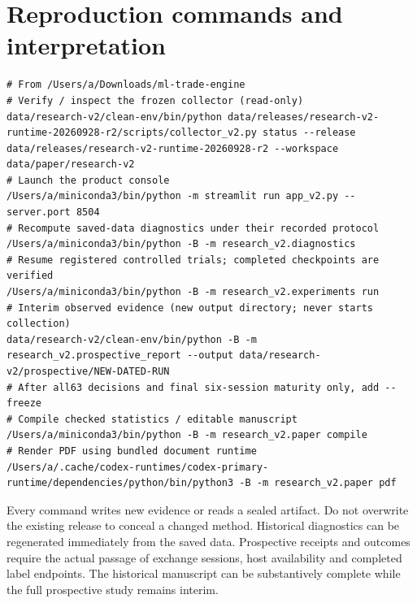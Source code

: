 \clearpage

\section{Reproduction commands and interpretation}\label{sec:appendix-c}

\begin{Verbatim}[breaklines=true,breakanywhere=true,fontsize=\scriptsize]
# From /Users/a/Downloads/ml-trade-engine
# Verify / inspect the frozen collector (read-only)
data/research-v2/clean-env/bin/python data/releases/research-v2-runtime-20260928-r2/scripts/collector_v2.py status --release data/releases/research-v2-runtime-20260928-r2 --workspace data/paper/research-v2
# Launch the product console
/Users/a/miniconda3/bin/python -m streamlit run app_v2.py --server.port 8504
# Recompute saved-data diagnostics under their recorded protocol
/Users/a/miniconda3/bin/python -B -m research_v2.diagnostics
# Resume registered controlled trials; completed checkpoints are verified
/Users/a/miniconda3/bin/python -B -m research_v2.experiments run
# Interim observed evidence (new output directory; never starts collection)
data/research-v2/clean-env/bin/python -B -m research_v2.prospective_report --output data/research-v2/prospective/NEW-DATED-RUN
# After all63 decisions and final six-session maturity only, add --freeze
# Compile checked statistics / editable manuscript
/Users/a/miniconda3/bin/python -B -m research_v2.paper compile
# Render PDF using bundled document runtime
/Users/a/.cache/codex-runtimes/codex-primary-runtime/dependencies/python/bin/python3 -B -m research_v2.paper pdf
\end{Verbatim}

Every command writes new evidence or reads a sealed artifact. Do not overwrite the existing release to conceal a changed method. Historical diagnostics can be regenerated immediately from the saved data. Prospective receipts and outcomes require the actual passage of exchange sessions, host availability and completed label endpoints. The historical manuscript can be substantively complete while the full prospective study remains interim.
